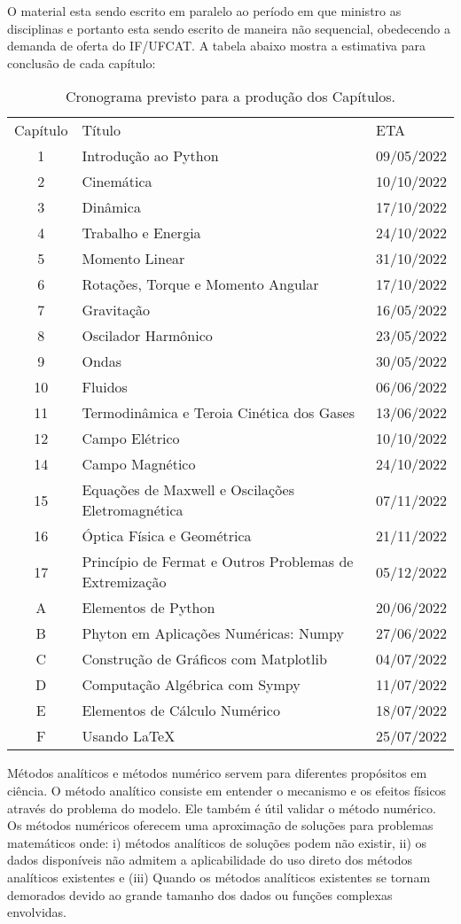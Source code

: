 O material esta sendo escrito em paralelo ao período em que ministro as disciplinas e portanto esta sendo escrito de maneira não sequencial, obedecendo a demanda de oferta do IF/UFCAT. A tabela abaixo mostra a estimativa para conclusão de cada capítulo:

\begin{table}[h]
    \centering
    \begin{tabular}{cll}
        Capítulo & Título & ETA  \\
        1 & Introdução ao Python & 09/05/2022 \\
        2 & Cinemática & 10/10/2022 \\
        3 & Dinâmica & 17/10/2022 \\ 
        4 & Trabalho e Energia & 24/10/2022 \\
        5 & Momento Linear & 31/10/2022 \\
        6 & Rotações, Torque e Momento Angular & 17/10/2022 \\
        7 & Gravitação & 16/05/2022 \\
        8 & Oscilador Harmônico & 23/05/2022 \\
        9 & Ondas & 30/05/2022 \\
        10 & Fluidos & 06/06/2022 \\
        11 & Termodinâmica e Teroia Cinética dos Gases & 13/06/2022\\
        12 & Campo Elétrico & 10/10/2022 \\
        14 & Campo Magnético & 24/10/2022 \\
        15 & Equações de Maxwell e Oscilações Eletromagnética & 07/11/2022\\
        16 & Óptica Física e Geométrica & 21/11/2022 \\
        17 & Princípio de Fermat e Outros Problemas de Extremização & 05/12/2022 \\
        A  & Elementos de Python & 20/06/2022 \\
        B  & Phyton em Aplicações Numéricas: Numpy & 27/06/2022 \\
        C  & Construção de Gráficos com Matplotlib & 04/07/2022 \\
        D  & Computação Algébrica com Sympy & 11/07/2022 \\
        E  & Elementos de Cálculo Numérico & 18/07/2022 \\
        F  & Usando \LaTeX & 25/07/2022
    \end{tabular}
    \caption{Cronograma previsto para a produção dos Capítulos.}
    
    Métodos analíticos e métodos numérico servem para diferentes propósitos em ciência. O método analítico consiste em entender o mecanismo e os efeitos físicos através do problema do modelo. Ele também é útil validar o método numérico. Os métodos numéricos oferecem uma aproximação de soluções para problemas matemáticos onde: i) métodos analíticos de soluções podem não existir, ii) os dados disponíveis não admitem a aplicabilidade do uso direto dos métodos analíticos existentes e (iii) Quando os métodos analíticos existentes se tornam demorados devido ao grande tamanho dos dados ou funções complexas envolvidas.
    
\end{table}